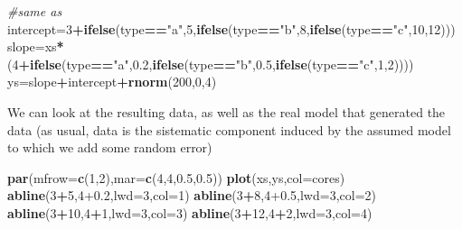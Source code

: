 \documentclass[
]{book}
\newenvironment{Shaded}{\begin{snugshade}}{\end{snugshade}}
\newcommand{\CommentTok}[1]{\textcolor[rgb]{0.56,0.35,0.01}{\textit{#1}}}
\newcommand{\DataTypeTok}[1]{\textcolor[rgb]{0.13,0.29,0.53}{#1}}
\newcommand{\DecValTok}[1]{\textcolor[rgb]{0.00,0.00,0.81}{#1}}
\newcommand{\FloatTok}[1]{\textcolor[rgb]{0.00,0.00,0.81}{#1}}
\newcommand{\KeywordTok}[1]{\textcolor[rgb]{0.13,0.29,0.53}{\textbf{#1}}}
\newcommand{\NormalTok}[1]{#1}
\newcommand{\OperatorTok}[1]{\textcolor[rgb]{0.81,0.36,0.00}{\textbf{#1}}}
\newcommand{\StringTok}[1]{\textcolor[rgb]{0.31,0.60,0.02}{#1}}
\begin{document}
\begin{Shaded}
\begin{Highlighting}[]
\CommentTok{#same as}
\NormalTok{intercept=}\DecValTok{3}\OperatorTok{+}\KeywordTok{ifelse}\NormalTok{(type}\OperatorTok{==}\StringTok{"a"}\NormalTok{,}\DecValTok{5}\NormalTok{,}\KeywordTok{ifelse}\NormalTok{(type}\OperatorTok{==}\StringTok{"b"}\NormalTok{,}\DecValTok{8}\NormalTok{,}\KeywordTok{ifelse}\NormalTok{(type}\OperatorTok{==}\StringTok{"c"}\NormalTok{,}\DecValTok{10}\NormalTok{,}\DecValTok{12}\NormalTok{)))}
\NormalTok{slope=xs}\OperatorTok{*}\NormalTok{(}\DecValTok{4}\OperatorTok{+}\KeywordTok{ifelse}\NormalTok{(type}\OperatorTok{==}\StringTok{"a"}\NormalTok{,}\FloatTok{0.2}\NormalTok{,}\KeywordTok{ifelse}\NormalTok{(type}\OperatorTok{==}\StringTok{"b"}\NormalTok{,}\FloatTok{0.5}\NormalTok{,}\KeywordTok{ifelse}\NormalTok{(type}\OperatorTok{==}\StringTok{"c"}\NormalTok{,}\DecValTok{1}\NormalTok{,}\DecValTok{2}\NormalTok{))))}
\NormalTok{ys=slope}\OperatorTok{+}\NormalTok{intercept}\OperatorTok{+}\KeywordTok{rnorm}\NormalTok{(}\DecValTok{200}\NormalTok{,}\DecValTok{0}\NormalTok{,}\DecValTok{4}\NormalTok{)}
\end{Highlighting}
\end{Shaded}

We can look at the resulting data, as well as the real model that generated the data (as usual, data is the sistematic component induced by the assumed model to which we add some random error)

\begin{Shaded}
\begin{Highlighting}[]
\KeywordTok{par}\NormalTok{(}\DataTypeTok{mfrow=}\KeywordTok{c}\NormalTok{(}\DecValTok{1}\NormalTok{,}\DecValTok{2}\NormalTok{),}\DataTypeTok{mar=}\KeywordTok{c}\NormalTok{(}\DecValTok{4}\NormalTok{,}\DecValTok{4}\NormalTok{,}\FloatTok{0.5}\NormalTok{,}\FloatTok{0.5}\NormalTok{))}
\KeywordTok{plot}\NormalTok{(xs,ys,}\DataTypeTok{col=}\NormalTok{cores)}
\KeywordTok{abline}\NormalTok{(}\DecValTok{3}\OperatorTok{+}\DecValTok{5}\NormalTok{,}\DecValTok{4}\FloatTok{+0.2}\NormalTok{,}\DataTypeTok{lwd=}\DecValTok{3}\NormalTok{,}\DataTypeTok{col=}\DecValTok{1}\NormalTok{)}
\KeywordTok{abline}\NormalTok{(}\DecValTok{3}\OperatorTok{+}\DecValTok{8}\NormalTok{,}\DecValTok{4}\FloatTok{+0.5}\NormalTok{,}\DataTypeTok{lwd=}\DecValTok{3}\NormalTok{,}\DataTypeTok{col=}\DecValTok{2}\NormalTok{)}
\KeywordTok{abline}\NormalTok{(}\DecValTok{3}\OperatorTok{+}\DecValTok{10}\NormalTok{,}\DecValTok{4}\OperatorTok{+}\DecValTok{1}\NormalTok{,}\DataTypeTok{lwd=}\DecValTok{3}\NormalTok{,}\DataTypeTok{col=}\DecValTok{3}\NormalTok{)}
\KeywordTok{abline}\NormalTok{(}\DecValTok{3}\OperatorTok{+}\DecValTok{12}\NormalTok{,}\DecValTok{4}\OperatorTok{+}\DecValTok{2}\NormalTok{,}\DataTypeTok{lwd=}\DecValTok{3}\NormalTok{,}\DataTypeTok{col=}\DecValTok{4}\NormalTok{)}
\end{Highlighting}
\end{Shaded}
\end{document}
